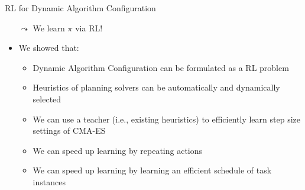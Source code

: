 \documentclass[aspectratio=169]{../latex_main/tntbeamer}  %
\begin{document}
\begin{frame}[c]{RL for Dynamic Algorithm Configuration}
	
	\begin{itemize}
		\item[$\leadsto$] We learn $\pi$ via RL! 
		\item We showed that:
		\begin{itemize}
			\item Dynamic Algorithm Configuration can be formulated as a RL problem~
			\item Heuristics of planning solvers can be automatically and dynamically selected~
			\item We can use a teacher (i.e., existing heuristics) to efficiently learn step size settings of CMA-ES~
			\item We can speed up learning by repeating actions~
			\item We can speed up learning by learning an efficient schedule of task instances~
		\end{itemize}
	\end{itemize}

	
\end{frame}
\end{document}
